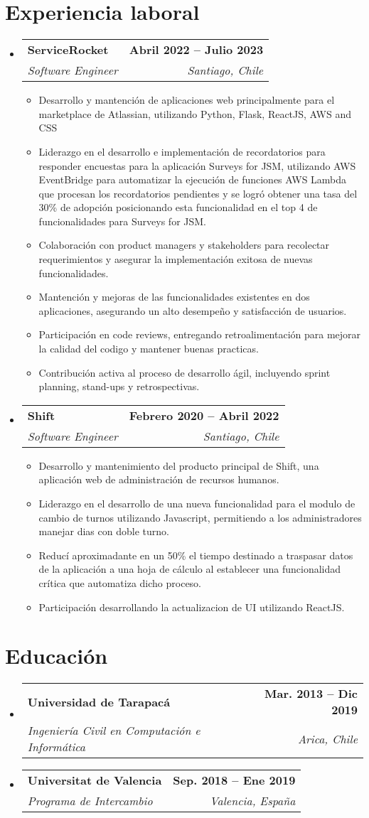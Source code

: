 \documentclass[letterpaper,11pt]{article}
\makeatletter
\newcommand{\resumeItem}[1]{
  \item\small{
    {#1 \vspace{-2pt}}
  }
}
\newcommand{\resumeSubheading}[4]{
  \vspace{-2pt}\item
    \begin{tabular*}{1.0\textwidth}[t]{l@{\extracolsep{\fill}}r}
      \textbf{#1} & \textbf{\small #2} \\
      \textit{\small#3} & \textit{\small #4} \\
    \end{tabular*}\vspace{-7pt}
}
\newcommand{\resumeSubHeadingListStart}{\begin{itemize}[leftmargin=0.0in, label={}]}
\newcommand{\resumeSubHeadingListEnd}{\end{itemize}}
\newcommand{\resumeItemListStart}{\begin{itemize}}
\newcommand{\resumeItemListEnd}{\end{itemize}\vspace{-5pt}}
\makeatother
\begin{document}
\section{Experiencia laboral}
  \resumeSubHeadingListStart
    \resumeSubheading
      {ServiceRocket}{Abril 2022 -- Julio 2023}
      {Software Engineer}{Santiago, Chile}
      \resumeItemListStart
        \resumeItem{Desarrollo y mantención de aplicaciones web principalmente para el marketplace de Atlassian, utilizando Python, Flask, ReactJS, AWS and CSS}
        \resumeItem{Liderazgo en el desarrollo e implementación de recordatorios para responder
        encuestas para la aplicación Surveys for JSM, utilizando AWS EventBridge para automatizar
        la ejecución de funciones AWS Lambda que procesan los recordatorios pendientes y se logró
        obtener una tasa del 30\% de adopción posicionando esta funcionalidad en el top 4 de
        funcionalidades para Surveys for JSM.}
        \resumeItem{Colaboración con product managers y stakeholders para recolectar requerimientos y asegurar la implementación exitosa de nuevas funcionalidades.}
        \resumeItem{Mantención y mejoras de las funcionalidades existentes en dos aplicaciones, asegurando un alto desempeño y satisfacción de usuarios.}
        \resumeItem{Participación en code reviews, entregando retroalimentación para mejorar la calidad del codigo y mantener buenas practicas.}
        \resumeItem{Contribución activa al proceso de desarrollo ágil, incluyendo sprint planning, stand-ups y retrospectivas.}
      \resumeItemListEnd
    \resumeSubheading
      {Shift}{Febrero 2020 -- Abril 2022}
      {Software Engineer}{Santiago, Chile}
      \resumeItemListStart
        \resumeItem{Desarrollo y mantenimiento del producto principal de Shift, una aplicación web de administración de recursos humanos.}
        \resumeItem{Liderazgo en el desarrollo de una nueva funcionalidad para el modulo de cambio de turnos utilizando Javascript, permitiendo a los administradores manejar dias con doble turno.}
        \resumeItem{Reducí aproximadante en un 50\% el tiempo destinado a traspasar datos de la 
        aplicación a una hoja de cálculo al establecer una funcionalidad crítica que automatiza
        dicho proceso.}
        \resumeItem{Participación desarrollando la actualizacion de UI utilizando ReactJS.}
      \resumeItemListEnd  
  \resumeSubHeadingListEnd
\vspace{-16pt}


\section{Educación}
  \resumeSubHeadingListStart
    \resumeSubheading
      {Universidad de Tarapacá}{Mar. 2013 -- Dic 2019}
      {Ingeniería Civil en Computación e Informática}{Arica, Chile}
    \resumeSubheading
      {Universitat de Valencia}{Sep. 2018 -- Ene 2019}
      {Programa de Intercambio}{Valencia, España}
  \resumeSubHeadingListEnd
\end{document}
